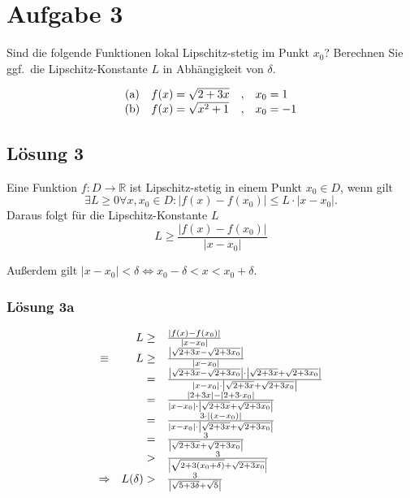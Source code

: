 \documentclass[main.tex]{subfiles}
\begin{document}
\section{Aufgabe 3}
Sind die folgende Funktionen lokal Lipschitz-stetig im Punkt $x_{0}$? Berechnen Sie ggf.\ die Lipschitz-Konstante $L$ in Abhängigkeit von $\delta$.

\begin{equation*}
    \begin{array}{ c l c l }
        \text{(a)} & f (x) =\sqrt{2+3x} & , & x_{0} =1\\
        \text{(b)} & f (x) =\sqrt{x^{2} +1} & , & x_{0} =-1
    \end{array}
\end{equation*}

\subsection{Lösung 3}
Eine Funktion $f:D\rightarrow \mathbb{R}$ ist Lipschitz-stetig in einem Punkt $x_{0} \in D$, wenn gilt
\begin{equation*}
    \exists L\geq 0\forall x,x_{0} \in D:| f( x) -f( x_{0})| \leq L\cdot | x-x_{0}| \text{.}
\end{equation*}
Daraus folgt für die Lipschitz-Konstante $L$
\begin{equation*}
    L\geq \frac{| f( x) -f( x_{0})| }{| x-x_{0}| }
\end{equation*}

Außerdem gilt $|x-x_{0} |< \delta \Leftrightarrow x_{0} -\delta < x< x_{0} +\delta $.

\subsubsection{Lösung 3a}

\begin{equation*}
    \begin{array}{ c r l }
     & L\geq  & \frac{| f( x) -f( x_{0})| }{| x-x_{0}| }\\
    \equiv  & L\geq  & \frac{\left| \sqrt{2+3x} -\sqrt{2+3x_{0}}\right| }{| x-x_{0}| }\\
     & = & \frac{\left| \sqrt{2+3x} -\sqrt{2+3x_{0}}\right| \cdot \left| \sqrt{2+3x} +\sqrt{2+3x_{0}}\right| }{| x-x_{0}| \cdot \left| \sqrt{2+3x} +\sqrt{2+3x_{0}}\right| }\\
     & = & \frac{|2+3x|-|2+3\cdot x_{0} |}{| x-x_{0}| \cdot \left| \sqrt{2+3x} +\sqrt{2+3x_{0}}\right| }\\
     & = & \frac{3\cdot |( x-x_{0}) |}{| x-x_{0}| \cdot \left| \sqrt{2+3x} +\sqrt{2+3x_{0}}\right| }\\
     & = & \frac{3}{\left| \sqrt{2+3x} +\sqrt{2+3x_{0}}\right| }\\
     &  > & \frac{3}{\left| \sqrt{2+3( x_{0} +\delta )} +\sqrt{2+3x_{0}}\right| }\\
    \Rightarrow  & L( \delta )  > & \frac{3}{\left| \sqrt{5+3\delta } +\sqrt{5}\right| }
    \end{array}
\end{equation*}
\end{document}
